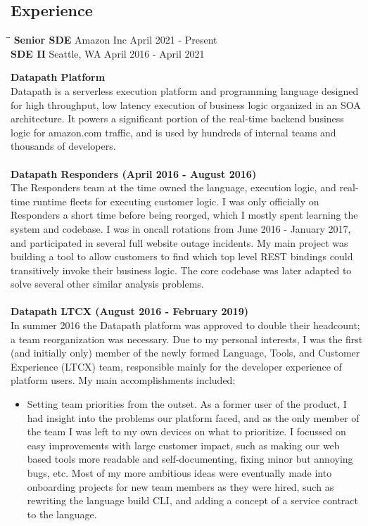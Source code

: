 \documentclass{res}
\begin{document}
\begin{resume}
\section{Experience}
   \vspace{-0.1in}
   \begin{tabbing}%
   \hspace{2.2in}\= \hspace{2.2in}\= \kill %
   {\bf Senior SDE}  \> Amazon Inc\> April 2021 - Present\\
   {\bf SDE II}          \> Seattle, WA \> April 2016 - April 2021
   \end{tabbing}\vspace{-17pt}
   {\large \bf Datapath Platform }\\
   Datapath is a serverless execution platform and programming language designed for high throughput, low latency execution of business logic organized in an SOA architecture.  It powers a significant portion of the real-time backend business logic for amazon.com traffic, and is used by hundreds of internal teams and thousands of developers.\\
   \\
   {\bf Datapath Responders (April 2016 - August 2016) }\\
   The Responders team at the time owned the language, execution logic, and real-time runtime fleets for executing customer logic.  I was only officially on Responders a short time before being reorged, which I mostly spent learning the system and codebase.  I was in oncall rotations from June 2016 - January 2017, and participated in several full website outage incidents.  My main project was building a tool to allow customers to find which top level REST bindings could transitively invoke their business logic.  The core codebase was later adapted to solve several other similar analysis problems.\\
   \\
   {\bf Datapath LTCX (August 2016 - February 2019) }\\
   In summer 2016 the Datapath platform was approved to double their headcount; a team reorganization was necessary.  Due to my personal interests, I was the first (and initially only) member of the newly formed Language, Tools, and Customer Experience (LTCX) team, responsible mainly for the developer experience of platform users.  My main accomplishments included:
   \begin{itemize}
   \item Setting team priorities from the outset.  As a former user of the product, I had insight into the problems our platform faced, and as the only member of the team I was left to my own devices on what to prioritize.  I focussed on easy improvements with large customer impact, such as making our web based tools more readable and self-documenting, fixing minor but annoying bugs, etc.  Most of my more ambitious ideas were eventually made into onboarding projects for new team members as they were hired, such as rewriting the language build CLI, and adding a concept of a service contract to the language.

\end{itemize}
\end{resume}
\end{document}
